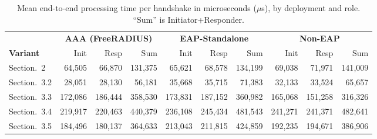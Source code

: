 \documentclass{easychair}
\newcommand{\VarSecShort}[1]{Section.~#1}
\begin{document}
\begin{table}[h]
\centering
\footnotesize
\caption{Mean end-to-end processing time per handshake in microseconds
($\mu$s), by deployment and role. ``Sum'' is Initiator+Responder.}
\label{tab:processing}
\begin{tabular}{lrrrrrrrrr}
\toprule
& \multicolumn{3}{c}{\textbf{AAA (FreeRADIUS)}} & \multicolumn{3}{c}{\textbf{EAP-Standalone}} & \multicolumn{3}{c}{\textbf{Non-EAP}} \\
\cmidrule(lr){2-4}\cmidrule(lr){5-7}\cmidrule(lr){8-10}
\textbf{Variant} & Init & Resp & Sum & Init & Resp & Sum & Init & Resp & Sum \\
\midrule
\VarSecShort{2}   &  64{,}505 &  66{,}870 & 131{,}375 &  65{,}621 &  68{,}578 & 134{,}199 &  69{,}038 &  71{,}971 & 141{,}009 \\
\VarSecShort{3.2} &  28{,}051 &  28{,}130 &  56{,}181 &  35{,}668 &  35{,}715 &  71{,}383 &  32{,}133 &  33{,}524 &  65{,}657 \\
\VarSecShort{3.3} & 172{,}086 & 186{,}444 & 358{,}530 & 173{,}831 & 187{,}152 & 360{,}982 & 165{,}068 & 151{,}258 & 316{,}326 \\
\VarSecShort{3.4} & 219{,}917 & 220{,}463 & 440{,}379 & 236{,}108 & 245{,}434 & 481{,}543 & 241{,}271 & 241{,}371 & 482{,}641 \\
\VarSecShort{3.5} & 184{,}496 & 180{,}137 & 364{,}633 & 213{,}043 & 211{,}815 & 424{,}859 & 192{,}235 & 194{,}671 & 386{,}906 \\
\bottomrule
\end{tabular}
\end{table}
\end{document}
